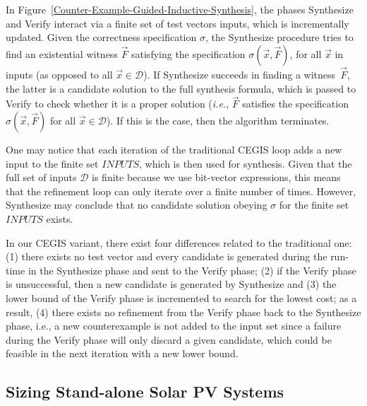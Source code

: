 \documentclass[runningheads]{llncs}
\begin{document}
In Figure~\ref{Counter-Example-Guided-Inductive-Synthesis}, the phases {\sc Synthesize} and {\sc Verify} interact via a finite set of test vectors {\sc inputs}, which is incrementally updated. Given the correctness specification $\sigma$, the {\sc Synthesize} procedure tries to find an existential witness $\vec{F}$ satisfying the specification $\sigma(\vec{x}, \vec{F})$, for all $\vec{x}$ in {\sc inputs} (as opposed to all $\vec{x} \in \mathcal{D}$). If {\sc Synthesize} succeeds in finding a witness~$\vec{F}$, the latter is a candidate solution to the full synthesis formula, which is passed to {\sc Verify} to check whether it is a proper solution ({\it i.e.}, $\vec{F}$ satisfies the specification $\sigma(\vec{x}, \vec{F})$ for all $\vec{x}\in\mathcal{D}$). If this is the case, then the algorithm terminates.

One may notice that each iteration of the traditional CEGIS loop adds a new input to the finite set $INPUTS$, which is then used for synthesis. Given that the full set of inputs $\mathcal{D}$ is finite because we use bit-vector expressions, this means that the refinement loop can only iterate over a finite number of times. However, {\sc Synthesize} may conclude that no candidate solution obeying $\sigma$ for the finite set $INPUTS$ exists. %

In our CEGIS variant, there exist four differences related to the traditional one: 
(1) there exists no test vector and every candidate is generated during the run-time in the {\sc Synthesize} phase and sent to the {\sc Verify} phase; 
(2) if the {\sc Verify} phase is unsuccessful, then a new candidate is generated by {\sc Synthesize} and 
(3) the lower bound of the {\sc Verify} phase is incremented to search for the lowest cost; as a result,
(4) there exists no refinement from the {\sc Verify} phase back to the {\sc Synthesize} phase, i.e., 
a new counterexample is not added to the {\sc input} set since a failure during the {\sc Verify} phase will only discard a given candidate, which could be feasible in the next iteration with a new lower bound.

\subsection{Sizing Stand-alone Solar PV Systems}
\label{sec:sizing}
\end{document}
